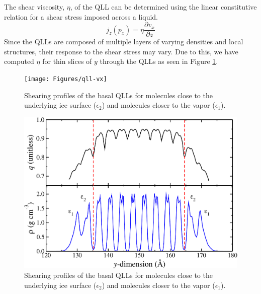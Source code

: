 The shear viscosity, $\eta$, of the QLL can be determined using the linear
constitutive relation for a shear stress imposed across a liquid.
\begin{equation}\label{eq:qll-visco}
j_z(p_x) = \eta \frac{\partial v_x}{\partial z}
\end{equation}
Since the QLLs are composed of multiple layers of varying densities
and local structures, their response to the shear stress may vary. Due
to this, we have computed $\eta$ for thin slices of $y$ through the
QLLs as seen in Figure \ref{fig:qll-vx}.

\begin{figure}
\texttt{[image: Figures/qll-vx]}
\caption{\label{fig:qll-vx} Shearing profiles of the basal QLLs for
  molecules close to the underlying ice surface ($\epsilon_{2}$) and
  molecules closer to the vapor ($\epsilon_{1}$). }
\end{figure}                


\begin{figure}
\includegraphics[width=\linewidth]{Figures/basal_rhoq}
\caption{\label{fig:basal_rhoq} Shearing profiles of the basal QLLs for
  molecules close to the underlying ice surface ($\epsilon_{2}$) and
  molecules closer to the vapor ($\epsilon_{1}$). }
\end{figure}                


